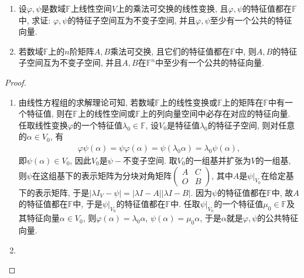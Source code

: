 \documentclass[../../main.tex]{subfiles}%
\begin{document}
\begin{proposition}\label{proposition:一般数域上乘法可交换诱导的性质}
\begin{enumerate}
\item 设\(\varphi,\psi\)是数域\(\mathbb{F}\)上线性空间\(V\)上的乘法可交换的线性变换, 且\(\varphi,\psi\)的特征值都在\(\mathbb{F}\)中, 求证: \(\varphi,\psi\)的特征子空间互为不变子空间, 并且\(\varphi,\psi\)至少有一个公共的特征向量.

\item 若数域\(\mathbb{F}\)上的\(n\)阶矩阵\(A,B\)乘法可交换, 且它们的特征值都在\(\mathbb{F}\)中, 则\(A,B\)的特征子空间互为不变子空间, 并且\(A,B\)在\(\mathbb{F}^n\)中至少有一个公共的特征向量.
\end{enumerate}
\end{proposition}
\begin{proof}
\begin{enumerate}
\item 由线性方程组的求解理论可知, 若数域\(\mathbb{F}\)上的线性变换或\(\mathbb{F}\)上的矩阵在\(\mathbb{F}\)中有一个特征值, 则在\(\mathbb{F}\)上的线性空间或\(\mathbb{F}\)上的列向量空间中必存在对应的特征向量. 任取线性变换\(\varphi\)的一个特征值\(\lambda_{0} \in \mathbb{F}\), 设\(V_{0}\)是特征值\(\lambda_{0}\)的特征子空间, 则对任意的\(\alpha \in V_{0}\), 有
\begin{align*}
\varphi\psi(\alpha)=\psi\varphi(\alpha)=\psi(\lambda_{0}\alpha)=\lambda_{0}\psi(\alpha),
\end{align*}
即\(\psi(\alpha) \in V_{0}\), 因此\(V_{0}\)是\(\psi -\)不变子空间. 取\(V_{0}\)的一组基并扩张为\(V\)的一组基, 则\(\psi\)在这组基下的表示矩阵为分块对角矩阵\(\begin{pmatrix}
A&C\\
O&B
\end{pmatrix}\), 其中\(A\)是\(\psi|_{V_{0}}\)在给定基下的表示矩阵, 于是\(|\lambda I_{V}-\psi| = |\lambda I - A||\lambda I - B|\). 因为\(\psi\)的特征值都在\(\mathbb{F}\)中, 故\(A\)的特征值都在\(\mathbb{F}\)中, 于是\(\psi|_{V_{0}}\)的特征值都在\(\mathbb{F}\)中. 任取\(\psi|_{V_{0}}\)的一个特征值\(\mu_{0} \in \mathbb{F}\)及其特征向量\(\alpha \in V_{0}\), 则\(\varphi(\alpha)=\lambda_{0}\alpha\), \(\psi(\alpha)=\mu_{0}\alpha\), 于是\(\alpha\)就是\(\varphi,\psi\)的公共特征向量. 

\item 
\end{enumerate}

\end{proof}
\end{document}
